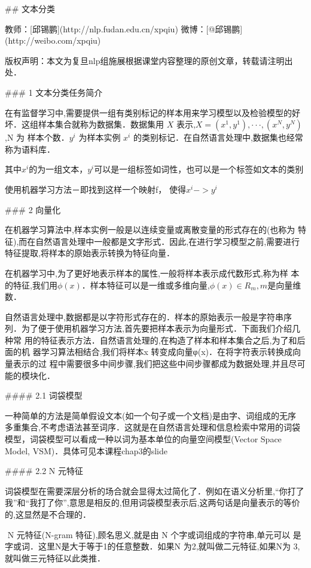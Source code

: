 ## 文本分类

教师：[邱锡鹏](http://nlp.fudan.edu.cn/xpqiu)  微博：[@邱锡鹏](http://weibo.com/xpqiu)

版权声明：本文为复旦nlp组施展根据课堂内容整理的原创文章，转载请注明出处．



### 1 文本分类任务简介

​	在有监督学习中,需要提供一组有类别标记的样本用来学习模型以及检验模型的好 坏．这组样本集合就称为数据集．数据集用 $X$ 表示,$X = {(x^1 , y^1 ), · · · , (x^N , y^N )}$,N 为 样本个数．$y^i$ 为样本实例 $x^i$ 的类别标记．在自然语言处理中,数据集也经常称为语料库．

其中$x^i$的为一组文本，$y^i$可以是一组标签如词性，也可以是一个标签如文本的类别

使用机器学习方法－即找到这样一个映射f， 使得$x^{i}->y^{i}$	

### 2 向量化

​	在机器学习算法中,样本实例一般是以连续变量或离散变量的形式存在的(也称为 特征),而在自然语言处理中一般都是文字形式．因此,在进行学习模型之前,需要进行 特征提取,将样本的原始表示转换为特征向量．

​	在机器学习中,为了更好地表示样本的属性,一般将样本表示成代数形式,称为样 本的特征,我们用$\phi(x)$．样本特征可以是一维或多维向量,$\phi(x) ∈ R_m,m$是向量维数．


​	自然语言处理中,数据都是以字符形式存在的．样本的原始表示一般是字符串序 列．为了便于使用机器学习方法,首先要把样本表示为向量形式．下面我们介绍几种常 用的特征表示方法．自然语言处理的,在构造了样本和样本集合之后,为了和后面的机 器学习算法相结合,我们将样本x 转变成向量φ(x)．在将字符表示转换成向量表示的过 程中需要很多中间步骤,我们把这些中间步骤都成为数据处理,并且尽可能的模块化．

#### 2.1 词袋模型

​	一种简单的方法是简单假设文本(如一个句子或一个文档)是由字、词组成的无序 多重集合,不考虑语法甚至词序．这就是在自然语言处理和信息检索中常用的词袋模型，词袋模型可以看成一种以词为基本单位的向量空间模型(Vector Space Model, VSM)．具体可见本课程chap3的slide

#### 2.2 N 元特征

​	词袋模型在需要深层分析的场合就会显得太过简化了．例如在语义分析里,“你打了 我”和“我打了你”,意思是相反的,但用词袋模型表示后,这两句话是向量表示的等价 的,这显然是不合理的．

​	N 元特征(N-gram 特征),顾名思义,就是由 N 个字或词组成的字符串,单元可以 是字或词．这里N是大于等于1的任意整数．如果N 为2,就叫做二元特征,如果N为 3,就叫做三元特征以此类推．

